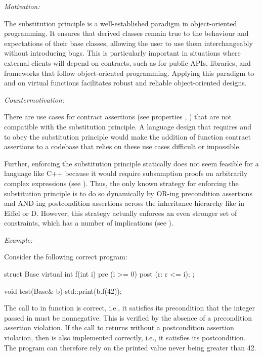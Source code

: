 \emph{Motivation:}

The substitution principle is a well-established paradigm in object-oriented programming. It ensures that derived classes remain true to the behaviour and expectations of their base classes, allowing the user to use them interchangeably without introducing bugs. This is particularly important in situations where external clients will depend on contracts, such as for public APIs, libraries, and frameworks that follow object-oriented programming. Applying this paradigm to  and  on virtual functions facilitates robust and reliable object-oriented designs.

\emph{Countermotivation:}

There are use cases for contract assertions (see properties , ) that are not compatible with the substitution principle. A language design that requires  and  to obey the substitution principle would make the addition of function contract assertions to a codebase that relies on these use cases difficult or impossible.

Further, enforcing the substitution principle statically does not seem feasible for a language like C++ because it would require subsumption proofs on arbitrarily complex expressions (see \cite{P3165R0}). Thus, the only known  strategy for enforcing the substitution principle is to do so dynamically by OR-ing precondition assertions and AND-ing postcondition assertions across the inheritance hierarchy like in Eiffel or D. However, this strategy actually enforces an even stronger set of constraints, which has a number of implications (see ).

\emph{Example:}

Consider the following correct program:
\begin{codeblock}
struct Base {
  virtual int f(int i)
    pre (i >= 0)
    post (r: r <= i);
};

void test(Base& b) {
  std::print(b.f(42));
}
\end{codeblock}
The call to  in function  is correct, i.e., it satisfies its precondition that the integer passed in must be nonnegative. This is verified by the absence of a precondition assertion violation. If the call to  returns without a postcondition assertion violation, then  is also implemented correctly, i.e., it satisfies its postcondition. The program can therefore rely on  the printed value never being greater than 42.

